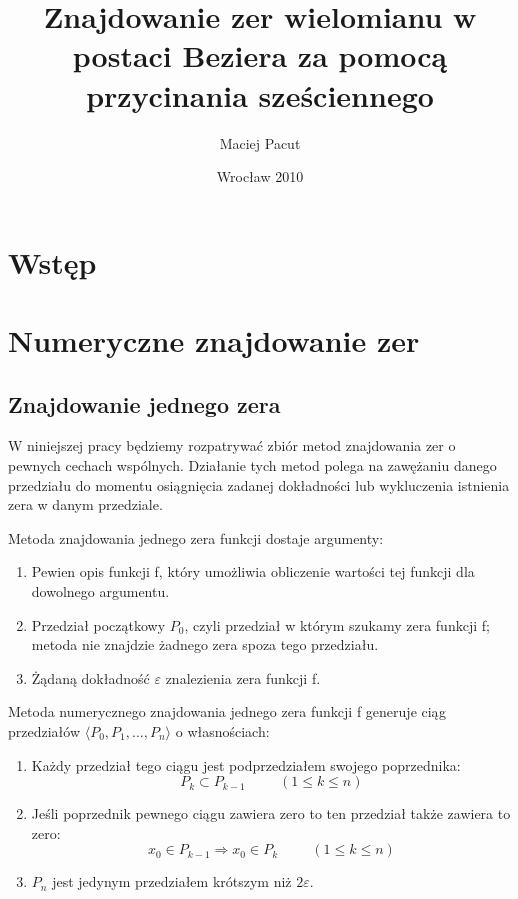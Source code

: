 \documentclass[11pt,a4paper,oneside]{report}
\title{Znajdowanie zer wielomianu w postaci Beziera za pomocą przycinania sześciennego}
\author{Maciej Pacut}
\date{Wrocław 2010}
\begin{document}
\maketitle
\newpage

\section{Wstęp}

\section{Numeryczne znajdowanie zer}

\subsection{Znajdowanie jednego zera}

W niniejszej pracy będziemy rozpatrywać zbiór metod znajdowania zer o pewnych cechach wspólnych. Działanie tych metod polega na zawężaniu danego przedziału do momentu osiągnięcia zadanej dokładności lub wykluczenia istnienia zera w danym przedziale.

Metoda znajdowania jednego zera funkcji dostaje argumenty:
\begin{enumerate}
\item Pewien opis funkcji f, który umożliwia obliczenie wartości tej funkcji dla dowolnego argumentu.
\item Przedział początkowy $P_0$, czyli przedział w którym szukamy zera funkcji f; metoda nie znajdzie żadnego zera spoza tego przedziału.
\item Żądaną dokładność $\varepsilon$ znalezienia zera funkcji f.
\end{enumerate}

Metoda numerycznego znajdowania jednego zera funkcji f generuje ciąg przedziałów $\langle P_0, P_1, ..., P_n\rangle$ o własnościach:
\begin{enumerate}
\item Każdy przedział tego ciągu jest podprzedziałem swojego poprzednika:
$$P_k \subset P_{k-1}\hspace{1cm}(1 \leq k \leq n)$$
\item Jeśli poprzednik pewnego ciągu zawiera zero to ten przedział także zawiera to zero:
$$ x_0 \in P_{k-1}\Rightarrow x_0 \in P_k\hspace{1cm}(1 \leq k \leq n)$$
\item $P_n$ jest jedynym przedziałem krótszym niż $2 \varepsilon$.
\end{enumerate}
\end{document}
